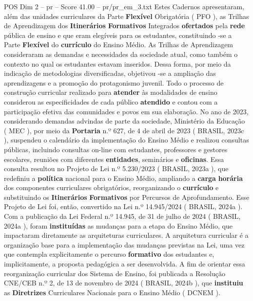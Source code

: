 \begin{textsample}{POS Dim 2 – pr – Score 41.00 – pr/pr\_em\_3.txt}
Estes Cadernos apresentaram, além das unidades curriculares da Parte \textbf{Flexível} Obrigatória ( PFO ), as Trilhas de Aprendizagem dos \textbf{Itinerários} \textbf{Formativos} Integrados \textbf{ofertados} pela \textbf{rede} pública de ensino e que eram elegíveis para os estudantes, constituindo -se a Parte \textbf{Flexível} do \textbf{currículo} do Ensino Médio.
As Trilhas de Aprendizagem consideraram as demandas e necessidades da sociedade atual, como também o contexto no qual os estudantes estavam inseridos.
Dessa forma, por meio da indicação de metodologias diversificadas, objetivou -se a ampliação das aprendizagens e a promoção do protagonismo juvenil.
Todo o processo de construção curricular realizado para \textbf{atender} às modalidades de ensino considerou as especificidades de cada público \textbf{atendido} e contou com a participação efetiva das comunidades e povos em sua elaboração.
No ano de 2023, considerando demandas advindas de parte da sociedade, Ministério da Educação ( MEC ), por meio da \textbf{Portaria} n.º 627, de 4 de abril de 2023 ( BRASIL, 2023c ), suspendeu o calendário da implementação do Ensino Médio e realizou consultas públicas, incluindo consultas on-line com estudantes, professores e gestores escolares, reuniões com diferentes \textbf{entidades}, seminários e \textbf{oficinas}.
Essa consulta resultou no Projeto de Lei n.º 5.230/2023 ( BRASIL, 2023a ), que redefiniu a \textbf{política} nacional para o Ensino Médio, ampliando a \textbf{carga} \textbf{horária} dos componentes curriculares obrigatórios, reorganizando o \textbf{currículo} e substituindo os \textbf{Itinerários} \textbf{Formativos} por Percursos de Aprofundamento.
Esse Projeto de Lei foi, então, convertido na Lei n.º 14.945/2024 ( BRASIL, 2024a ).
Com a publicação da Lei Federal n.º 14.945, de 31 de julho de 2024 ( BRASIL, 2024a ), foram \textbf{instituídas} as mudanças para a etapa do Ensino Médio, que impactaram diretamente as arquiteturas curriculares.
A arquitetura curricular é a organização base para a implementação das mudanças previstas na Lei, uma vez que contempla explicitamente o percurso \textbf{formativo} dos estudantes e, implicitamente, a proposta pedagógica a ser desenvolvida.
A fim de orientar essa reorganização curricular dos Sistema de Ensino, foi publicada a Resolução CNE/CEB n.º 2, de 13 de novembro de 2024 ( BRASIL, 2024b ), que \textbf{instituiu} as \textbf{Diretrizes} Curriculares Nacionais para o Ensino Médio ( DCNEM ).

\end{textsample}
